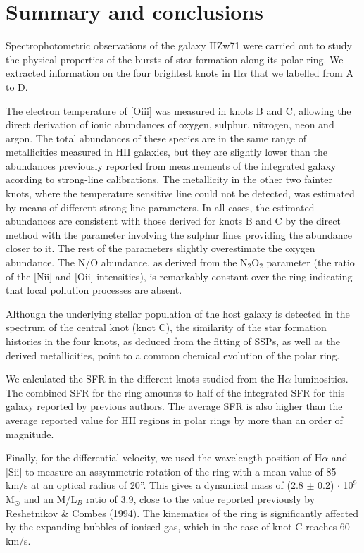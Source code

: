 \documentclass[structabstract]{aa}
\begin{document}
\section{Summary and conclusions}

Spectrophotometric observations of the galaxy IIZw71 were carried
out to study the physical properties of the bursts of star formation along its
polar ring. We extracted information
on the four brightest knots in H$\alpha$ that we labelled from A to D.

The electron temperature of [O{\sc iii}] was measured in knots B and C,
allowing the direct derivation of ionic abundances of oxygen, sulphur, nitrogen, neon and
argon. The total abundances of these species are in the same range of metallicities
measured in HII galaxies, but they are slightly lower than the abundances previously reported
from measurements of the integrated galaxy acording to strong-line calibrations. The metallicity in the other two fainter knots, where the temperature sensitive line could not be detected, was estimated by means of different strong-line parameters. In all cases, the estimated abundances are consistent with those derived for knots B and C by the direct method with the parameter involving the sulphur lines  providing the abundance closer to it. The rest of the parameters slightly overestimate the oxygen abundance. The N/O abundance, as derived from the N$_2$O$_2$ parameter (the ratio of the [N{\sc ii}] and [O{\sc ii}] intensities), is remarkably constant over the ring indicating that local pollution processes are absent.  

Although the underlying stellar population of the host galaxy is detected in the spectrum of the
central knot (knot C), the similarity of the star formation histories in the four knots, as deduced from the fitting of SSPs, as well as the  derived metallicities, point to a common chemical evolution of the polar ring.

We calculated the SFR in the different knots studied from the H$\alpha$ luminosities. The combined SFR for the ring amounts to half of the integrated SFR for this galaxy reported by previous authors. The average SFR is also higher than the average reported value for HII regions in polar rings by more than an order of magnitude.

Finally, for the differential velocity, we used the wavelength position of H$\alpha$
and [S{\sc ii}] to measure an assymmetric rotation of the ring with a mean value
of 85 km/s at an optical radius of 20''. This gives a dynamical mass of (2.8 $\pm$ 0.2) $\cdot$ 10$^9$ M$_\odot$ and an M/L$_B$ ratio of 3.9, close to the value reported previously by Reshetnikov \& Combes (1994).
The kinematics of the ring is significantly affected by the expanding bubbles of ionised gas, which
in the case of knot C reaches 60 km/s.
\end{document}
